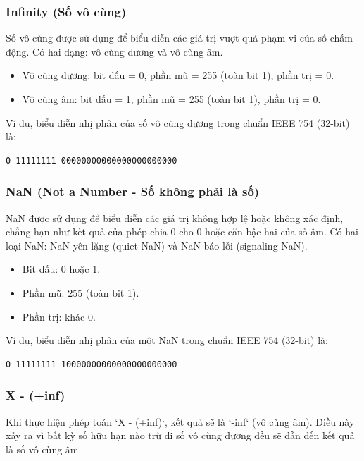 \subsubsection{Infinity (Số vô cùng)}

Số vô cùng được sử dụng để biểu diễn các giá trị vượt quá phạm vi của số chấm động. Có hai dạng: vô cùng dương và vô cùng âm.

\begin{itemize}
	\item Vô cùng dương: bit dấu = 0, phần mũ = 255 (toàn bit 1), phần trị = 0.
	\item Vô cùng âm: bit dấu = 1, phần mũ = 255 (toàn bit 1), phần trị = 0.
\end{itemize}

Ví dụ, biểu diễn nhị phân của số vô cùng dương trong chuẩn IEEE 754 (32-bit) là:
\begin{verbatim}
0 11111111 00000000000000000000000
\end{verbatim}

\subsubsection{NaN (Not a Number - Số không phải là số)}

NaN được sử dụng để biểu diễn các giá trị không hợp lệ hoặc không xác định, chẳng hạn như kết quả của phép chia 0 cho 0 hoặc căn bậc hai của số âm. Có hai loại NaN: NaN yên lặng (quiet NaN) và NaN báo lỗi (signaling NaN).

\begin{itemize}
	\item Bit dấu: 0 hoặc 1.
	\item Phần mũ: 255 (toàn bit 1).
	\item Phần trị: khác 0.
\end{itemize}

Ví dụ, biểu diễn nhị phân của một NaN trong chuẩn IEEE 754 (32-bit) là:
\begin{verbatim}
0 11111111 10000000000000000000000
\end{verbatim}

\subsubsection{X - (+inf)}

Khi thực hiện phép toán `X - (+inf)`, kết quả sẽ là `-inf` (vô cùng âm). Điều này xảy ra vì bất kỳ số hữu hạn nào trừ đi số vô cùng dương đều sẽ dẫn đến kết quả là số vô cùng âm.

